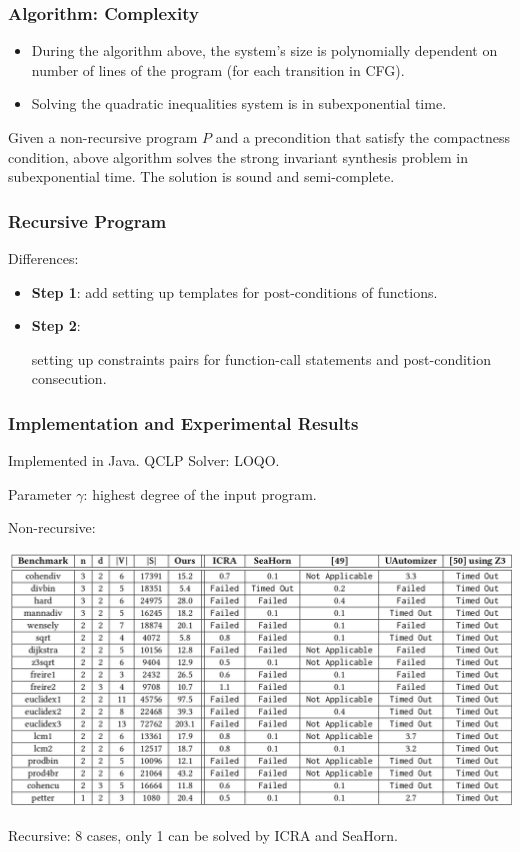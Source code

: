 \documentclass[11pt]{beamer}
\begin{document}
\begin{frame}\frametitle{Algorithm: Complexity}
\begin{itemize}

\item During the algorithm above, the system's size is polynomially dependent on number of lines of the program (for each transition in CFG).

\item Solving the quadratic inequalities system is in subexponential time.
\end{itemize}

\begin{theorem}
Given a non-recursive program $P$ and a precondition that satisfy the compactness condition, above algorithm solves the strong invariant synthesis problem in subexponential time. The solution is sound and semi-complete.
\end{theorem}


\end{frame}

\begin{frame}\frametitle{Recursive Program}
Differences:

\begin{itemize}
\item \textbf{Step 1}: add setting up templates for post-conditions of functions.

\item \textbf{Step 2}: 

setting up constraints pairs for function-call statements and post-condition consecution.

\end{itemize}



\end{frame}

\begin{frame}\frametitle{Implementation and Experimental Results}

\begin{small}

Implemented in Java. 
QCLP Solver: LOQO.

Parameter $\gamma$: highest degree of the input program.

Non-recursive: 
\begin{center}
\includegraphics[scale=0.22]{nonrec.png}
\end{center}
Recursive: 8 cases, only  1 can be solved by ICRA and SeaHorn.
\end{small}
\end{frame}
\end{document}
